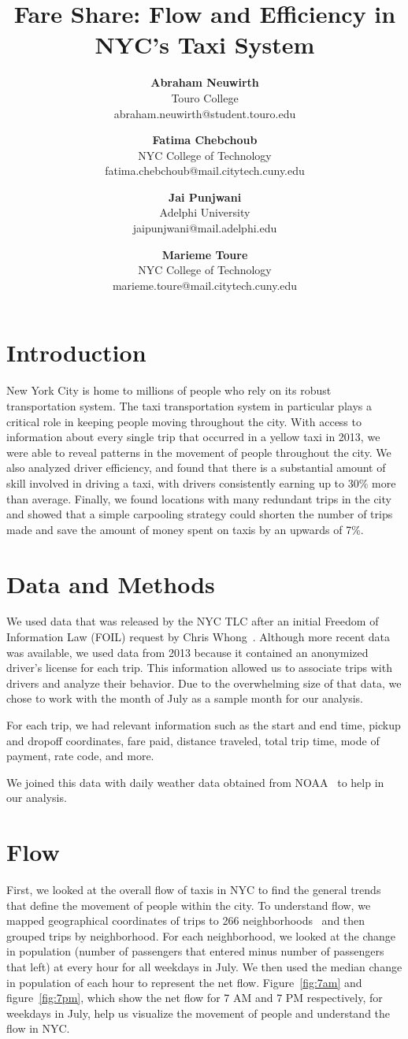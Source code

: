 \documentclass[twocolumn]{article}
\title{\vspace{-0.25in}Fare Share: Flow and Efficiency in NYC's Taxi System}
\author{
\normalsize{\textbf{Abraham Neuwirth}}\\ 
\small Touro College \\ 
\small abraham.neuwirth@student.touro.edu
\and 
\normalsize{\textbf{Fatima Chebchoub}}\\ 
\small NYC College of Technology\\ 
\small fatima.chebchoub@mail.citytech.cuny.edu 
\and 
\normalsize{\textbf{Jai Punjwani}}\\
\small Adelphi University\\
\small jaipunjwani@mail.adelphi.edu 
\and 
\normalsize{\textbf{Marieme Toure}}\\ 
\small NYC College of Technology\\ 
\small marieme.toure@mail.citytech.cuny.edu
}
\date{\vspace{-5ex}}
\begin{document}
\twocolumn[
\begin{@twocolumnfalse}
\maketitle

\end{@twocolumnfalse}
]
\section{Introduction}
New York City is home to millions of people who rely on its robust transportation system. The taxi transportation system in  particular plays a critical role in keeping people moving throughout the city. With access to information about every single  trip that occurred in a yellow taxi in 2013, we were able to reveal patterns in the movement of people throughout the city. We also analyzed driver efficiency, and found that there is a substantial amount of skill involved in driving a taxi, with drivers consistently earning up to 30\% more than average. Finally, we found locations with many redundant trips in the city and showed that a simple carpooling strategy could shorten the number of trips made and save the amount of money spent on taxis by an upwards of 7\%.

\section{Data and Methods}
We used data that was released by the NYC TLC after an initial Freedom of Information Law (FOIL) request by Chris Whong~\cite{Whong:2014}. Although more recent data was available, we used data from 2013 because it contained an anonymized driver’s license for each trip. This information allowed us to associate trips with drivers and analyze their behavior. Due to the overwhelming size of that data, we chose to work with the month of July as a sample month for our analysis. 

For each trip, we had relevant information such as the start and end time, pickup and dropoff coordinates, fare paid, distance traveled, total trip time, mode of payment, rate code, and more.

We joined this data with daily weather data obtained from NOAA~\cite{NOAA:2016} to help in our analysis. 
\section{Flow}
First, we looked at the overall flow of taxis in NYC to find the general trends that define the movement of people within the city. To understand flow, we mapped geographical coordinates of trips to 266 neighborhoods~\cite{PEDIACITIES:2015} and then grouped trips by neighborhood. For each neighborhood, we looked at the change in population (number of passengers that entered minus number of passengers that left) at every hour for all weekdays in July. We then used the median change in population of each hour to represent the net flow. Figure~\ref{fig:7am} and figure~\ref{fig:7pm}, which show the net flow for 7 AM and 7 PM respectively, for weekdays in July, help us visualize the movement of people and understand the flow in NYC.
\end{document}
